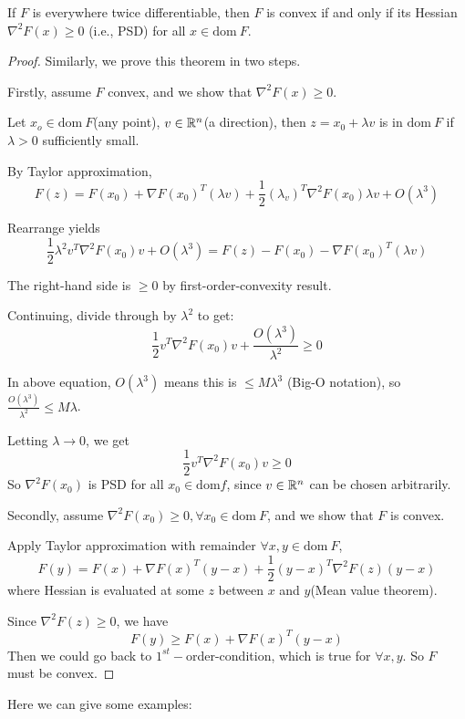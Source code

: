 \begin{theorem}
	If $F$ is everywhere twice differentiable, then $F$ is convex if and only if its Hessian $\nabla^2F(x)\geq 0$ (i.e., PSD) for all $x\in \text{dom}\ F$.
\end{theorem}

\begin{proof}

Similarly, we prove this theorem in two steps.

Firstly, assume $F$ convex, and we show that $\nabla^2F(x)\geq 0$.

Let $x_o \in \text{dom}\ F$(any point), $v\in \mathbb{R}^n$(a direction), then $z = x_0 + \lambda v$ is in $\text{dom}\ F$ if $\lambda > 0$ sufficiently small. 

By Taylor approximation, 
$$F(z) = F(x_0) + \nabla F(x_0)^T(\lambda v) + \frac{1}{2}(\lambda_v)^T\nabla^2F(x_0)\lambda v + O(\lambda^3)$$

Rearrange yields 
$$\frac{1}{2}\lambda^2v^T\nabla^2F(x_0)v+O(\lambda^3) = F(z) - F(x_0) - \nabla F(x_0)^T(\lambda v)$$

The right-hand side is $\geq 0$ by first-order-convexity result.

Continuing, divide through by $\lambda^2$ to get:
$$\frac{1}{2}v^T\nabla^2F(x_0)v + \frac{O(\lambda^3)}{\lambda^2} \geq 0$$

In above equation, $O(\lambda^3)$ means this is $\leq M\lambda^3$ (Big-O notation), so $\frac{O(\lambda^3)}{\lambda^2} \leq M\lambda$.

Letting $\lambda\rightarrow 0$, we get 
$$\frac{1}{2}v^T\nabla^2F(x_0)v\geq 0$$
So $\nabla^2F(x_0)$ is PSD for all $x_0 \in \text{dom}f$, since $v\in \mathbb{R}^n$ can be chosen arbitrarily.


\vspace{0.3cm}
Secondly, assume $\nabla^2F(x_0)\geq 0, \forall x_0\in \text{dom}\ F$, and we show that $F$ is convex.

Apply Taylor approximation with remainder $\forall x,y\in \text{dom}\ F$, 
$$F(y) =F(x) + \nabla F(x)^T(y-x) + \frac{1}{2}(y-x)^T\nabla^2F(z)(y-x)$$
where Hessian is evaluated at some $z$ between $x$ and $y$(Mean value theorem).

Since $\nabla^2F(z)\geq 0$, we have
$$F(y) \geq F(x) + \nabla F(x)^T (y-x)$$
Then we could go back to $1^{st}-$order-condition, which is true for $\forall x,y$. So $F$ must be convex. 
\end{proof}



Here we can give some examples:

